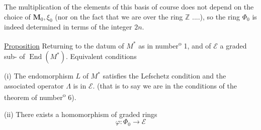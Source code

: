 
The multiplication of the elements of this basis of course does not depend on the choice of $\mathbf M_0,\xi_0$ (nor on the fact that we are over the ring $\mathbb Z$ ....), so the ring $\Phi_0$ is indeed determined in terms of the  integer $2n$.

\uline{Proposition} Returning to the datum of $M^*$ as in number\textsuperscript{o} 1, and of $\mathcal E$ a graded sub- of  $\operatorname{End}(M^*)$.
Equivalent conditions

(i) The endomorphism $L$ of $M^*$ satisfies the  Lefschetz condition and the associated operator $\Lambda$ is in $\mathcal E$.
(that is to say we are in the conditions of the theorem of number\textsuperscript{o} 6).

(ii) There exists a homomorphism of graded rings
\[
\varphi:\Phi_0\longrightarrow\mathcal E
\]
